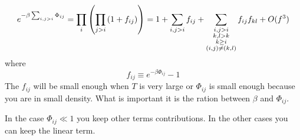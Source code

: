 \documentclass[../main/main.tex]{subfiles}
\begin{document}

\begin{equation}
  e^{-\beta \sum_{i,j>i}^{} \Phi _{ij}  } = \prod_{i}^{} \qty(\prod_{j>i}^{} \qty(1+f_{ij})   ) = 1 + \sum_{i,j>i}^{} f_{ij} + \sum_{\substack{i,j>i \\ k,l> k \\
  k \ge i \\ (i,j) \neq (k,l) } }^{} f_{ij} f_{kl}   + O (f^3)
\end{equation}
where
\begin{equation}
  f_{ij} \equiv  e^{-\beta \Phi _{ij}} -1
\end{equation}
The \( f_{ij} \)  will be small enough when \( T \) is very large or \( \Phi _{ij} \) is small enough because you are in small density. What is important it is the ration between \( \beta  \)  and \( \Phi _{ij} \).

In the case \( \Phi _{ij} \ll 1 \) you keep other terms contributions. In the other cases you can keep the linear term.
\end{document}
